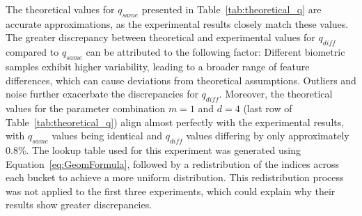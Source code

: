 The theoretical values for \(q_{same}\) presented in Table~\ref{tab:theoretical_q} are accurate approximations, as the experimental results closely match these values. The greater discrepancy between theoretical and experimental values for \(q_{diff}\) compared to \(q_{same}\) can be attributed to the following factor: Different biometric samples exhibit higher variability, leading to a broader range of feature differences, which can cause deviations from theoretical assumptions. Outliers and noise further exacerbate the discrepancies for \(q_{diff}\). Moreover, the theoretical values for the parameter combination \(m=1\) and \(d=4\) (last row of Table~\ref{tab:theoretical_q}) align almost perfectly with the experimental results, with \(q_{same}\) values being identical and \(q_{diff}\) values differing by only approximately 0.8\%. The lookup table used for this experiment was generated using Equation~\ref{eq:GeomFormula}, followed by a redistribution of the indices across each bucket to achieve a more uniform distribution. This redistribution process was not applied to the first three experiments, which could explain why their results show greater discrepancies.


